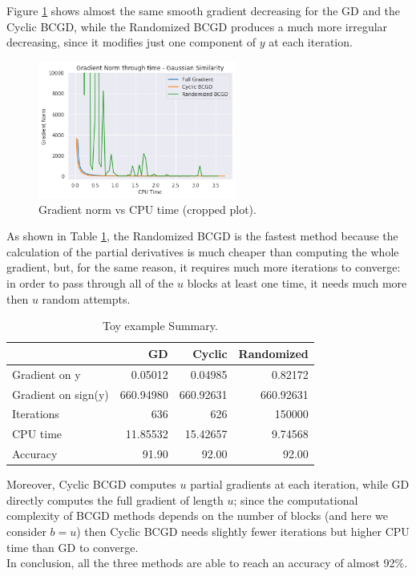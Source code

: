 \documentclass[10pt,twocolumn,letterpaper]{article}
\begin{document}
Figure \ref{fig:gradient} shows almost the same smooth gradient decreasing for the GD and the Cyclic BCGD, while the Randomized BCGD produces a much more irregular decreasing, since it modifies just one component of $y$ at each iteration.
\renewcommand{\thefigure}{2}
\begin{figure}[htbp]
	\centering
	\includegraphics[width=6.5cm]{img/gradplot_cropped}
	\caption{Gradient norm vs CPU time (cropped plot).}
	\label{fig:gradient}
\end{figure}

As shown in Table \ref{tab:toy}, the Randomized BCGD is the fastest method because the calculation of the partial derivatives is much cheaper than computing the whole gradient, but, for the same reason, it requires much more iterations to converge: in order to pass through all of the $u$ blocks at least one time, it needs much more then $u$ random attempts.\\

\begin{table}[h]
	\begin{center}
	\begin{adjustwidth}{-1.3cm}{}
	\begin{tabular}{lrrr}
	{} &          GD &      Cyclic &     Randomized \\
	\midrule
	Gradient on y       &    0.05012 &    0.04985 &       0.82172 \\
	Gradient on sign(y) &  660.94980 &  660.92631 &     660.92631 \\
	Iterations          &  636 &  626 &  150000 \\
	CPU time            &   11.85532 &   15.42657 &       9.74568 \\
	Accuracy            &   91.90 &   92.00 &      92.00 \\
	\end{tabular}
	\end{adjustwidth}
	\end{center}
	\caption{Toy example Summary.}
	\label{tab:toy}
\end{table}
Moreover, Cyclic BCGD computes $u$ partial gradients at each iteration, while GD directly computes the full gradient of length $u$; since the computational complexity of BCGD methods depends on the number of blocks (and here we consider $b=u$) then Cyclic BCGD needs slightly fewer iterations but higher CPU time than GD to converge.\\
In conclusion, all the three methods are able to reach an accuracy of almost 92\%.
\end{document}
